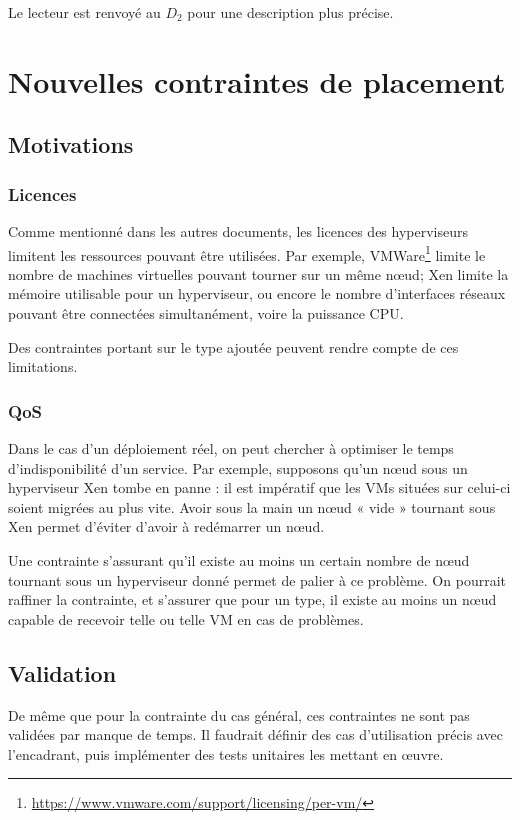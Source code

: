 \documentclass[a4paper]{article}
\begin{document}
Le lecteur est renvoyé au $D_2$ pour une description plus précise.

\section{Nouvelles contraintes de placement}
\subsection{Motivations}
\subsubsection{Licences}
Comme mentionné dans les autres documents, les licences des hyperviseurs
limitent les ressources pouvant être utilisées. Par exemple,
VMWare\footnote{\url{https://www.vmware.com/support/licensing/per-vm/}}
limite le nombre de machines virtuelles pouvant tourner sur un même nœud;
Xen limite la mémoire utilisable pour un hyperviseur, ou encore le nombre
d'interfaces réseaux pouvant être connectées simultanément, voire la puissance
CPU.

Des contraintes portant sur le type ajoutée peuvent rendre compte de ces
limitations.
\subsubsection{QoS}
Dans le cas d'un déploiement réel, on peut chercher à optimiser le temps
d'indisponibilité d'un service. Par exemple, supposons qu'un nœud sous un
hyperviseur Xen tombe en panne : il est impératif que les VMs situées sur
celui-ci soient migrées au plus vite. Avoir sous la main un nœud « vide »
tournant sous Xen permet d'éviter d'avoir à redémarrer un nœud.

Une contrainte s'assurant qu'il existe au moins un certain nombre de nœud
tournant sous un hyperviseur donné permet de palier à ce problème. On
pourrait raffiner la contrainte, et s'assurer que pour un type, il existe
au moins un nœud capable de recevoir telle ou telle VM en cas de problèmes.

\subsection{Validation}
De même que pour la contrainte du cas général, ces contraintes ne sont
pas validées par manque de temps. Il faudrait définir des cas d'utilisation
précis avec l'encadrant, puis implémenter des tests unitaires les mettant
en œuvre.
\end{document}
